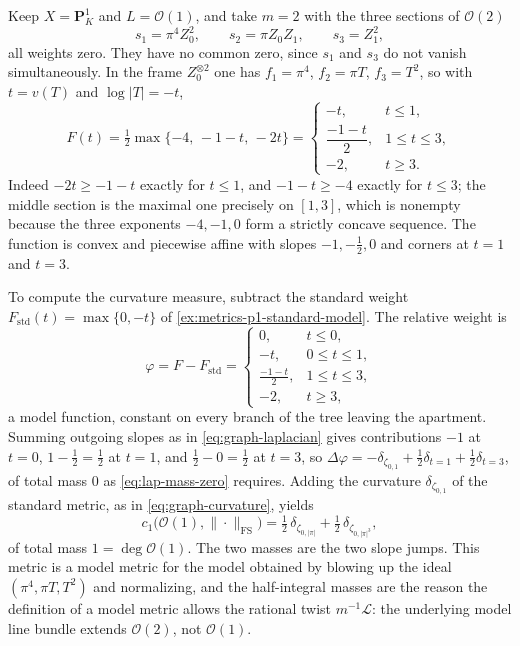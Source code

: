 \begin{example}
\label{ex:metrics-fs-two-corners}
Keep $X=\mathbf P^1_K$ and $L=\mathcal O(1)$, and take $m=2$ with the
three sections of $\mathcal O(2)$
\[
 s_1=\pi^4Z_0^2,\qquad s_2=\pi Z_0Z_1,\qquad s_3=Z_1^2,
\]
all weights zero. They have no common zero, since $s_1$ and $s_3$ do
not vanish simultaneously. In the frame $Z_0^{\otimes2}$ one has
$f_1=\pi^4$, $f_2=\pi T$, $f_3=T^2$, so with $t=v(T)$ and
$\log|T|=-t$,
\[
 F(t)=\tfrac12\max\{-4,\,-1-t,\,-2t\}
 =\begin{cases}
   -t,&t\le1,\\[1mm]
   \dfrac{-1-t}2,&1\le t\le3,\\[2mm]
   -2,&t\ge3 .
  \end{cases}
\]
Indeed $-2t\ge-1-t$ exactly for $t\le1$, and $-1-t\ge-4$ exactly for
$t\le3$; the middle section is the maximal one precisely on $[1,3]$,
which is nonempty because the three exponents $-4,-1,0$ form a strictly
concave sequence. The function is convex and piecewise affine with slopes
$-1,-\tfrac12,0$ and corners at $t=1$ and $t=3$.

To compute the curvature measure, subtract the standard weight
$F_{\mathrm{std}}(t)=\max\{0,-t\}$ of
\cref{ex:metrics-p1-standard-model}. The relative weight is
\[
 \varphi=F-F_{\mathrm{std}}
 =\begin{cases}
   0,&t\le0,\\
   -t,&0\le t\le1,\\
   \tfrac{-1-t}2,&1\le t\le3,\\
   -2,&t\ge3,
  \end{cases}
\]
a model function, constant on every branch of the tree leaving the
apartment. Summing outgoing slopes as in \eqref{eq:graph-laplacian} gives
contributions $-1$ at $t=0$, $1-\tfrac12=\tfrac12$ at $t=1$, and
$\tfrac12-0=\tfrac12$ at $t=3$, so
$\Delta\varphi=-\delta_{\zeta_{0,1}}+\tfrac12\delta_{t=1}
+\tfrac12\delta_{t=3}$, of total mass $0$ as
\eqref{eq:lap-mass-zero} requires. Adding the curvature
$\delta_{\zeta_{0,1}}$ of the standard metric, as in
\eqref{eq:graph-curvature}, yields
\[
 c_1\bigl(\mathcal O(1),\|\cdot\|_{\mathrm{FS}}\bigr)
 =\tfrac12\,\delta_{\zeta_{0,|\pi|}}+\tfrac12\,\delta_{\zeta_{0,|\pi|^3}},
\]
of total mass $1=\deg\mathcal O(1)$. The two masses are the two slope
jumps. This metric is a model metric for the model obtained by blowing up
the ideal $(\pi^4,\pi T,T^2)$ and normalizing, and the half-integral
masses are the reason the definition of a model metric allows the rational
twist $m^{-1}\mathcal L$: the underlying model line bundle extends
$\mathcal O(2)$, not $\mathcal O(1)$.
\end{example}

